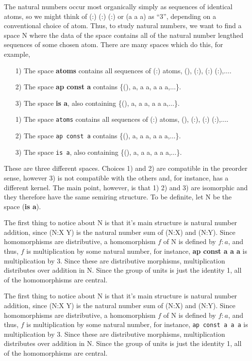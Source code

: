 \documentclass[11pt]{article}
\begin{document}
      The natural numbers occur most organically simply as sequences of identical atoms, so we might think of (:) (:) (:) or (a a a) as ``3'', depending on a conventional choice of atom.  
Thus, to study natural numbers, we want to find a space N where the data of the space contains all of the natural number lengthed sequences of some chosen atom.  There are many 
spaces which do this, for example,  
\begin{itemize}
\item [1)] The space {\bf atoms} contains all sequences of (:) atoms, (), (:), (:) (:),$\dots$. 
\item [2)] The space {\bf ap const a} contains \{(), a, a a, a a a,$\dots$\}. 
\item [3)] The space {\bf is a}, also containing \{(), a, a a, a a a,$\dots$\}.
\end{itemize}
\begin{itemize}
\item [1)] The space \texttt{atoms} contains all sequences of (:) atoms, (), (:), (:) (:),$\dots$. 
\item [2)] The space \texttt{ap const a} contains \{(), a, a a, a a a,$\dots$\}. 
\item [3)] The space \texttt{is a}, also containing \{(), a, a a, a a a,$\dots$\}.
\end{itemize}
These are three different spaces.  Choices 1) and 2) are compatible in the preorder sense, however 3) is not compatible with the others and, for instance, has a different kernel.  The main point, however, is that 1) 2) and 3) are isomorphic and they therefore have the same semiring structure.  To be definite, let N be the space ({\bf is a}).  
      
     The first thing to notice about N is that it's main structure is natural number addition, since (N:X Y) is the natural number sum of (N:X) and (N:Y).  Since homomorphisms are distributive, a homomorphism $f$ of N is defined by $f:a$, and thus, $f$ is multiplication by some natural number, for instance, {\bf ap const a a a} is multiplication by 3.  Since these are distributive morphisms, multiplication distributes over addition in N.  Since the group of units is just the identity 1, all of the homomorphisms are central.  
     
     The first thing to notice about N is that it's main structure is natural number addition, since (N:X Y) is the natural number sum of (N:X) and (N:Y).  Since homomorphisms are distributive, a homomorphism $f$ of N is defined by $f:a$, and thus, $f$ is multiplication by some natural number, for instance, \texttt{ap const a a a} is multiplication by 3.  Since these are distributive morphisms, multiplication distributes over addition in N.  Since the group of units is just the identity 1, all of the homomorphisms are central.  
     
\end{document}
